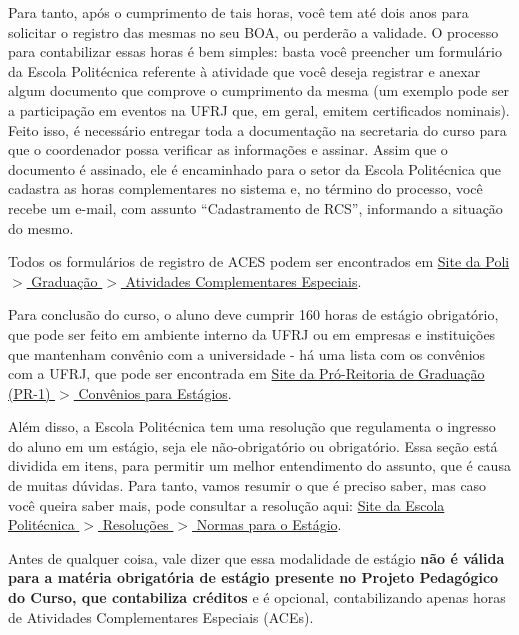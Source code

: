         Para tanto, após o cumprimento de tais horas, você tem até dois anos para solicitar o registro das mesmas no seu BOA, ou perderão a validade. O processo para contabilizar essas horas é bem simples: basta você preencher um formulário da Escola Politécnica referente à atividade que você deseja registrar e anexar algum documento que comprove o cumprimento da mesma (um exemplo pode ser a participação em eventos na UFRJ que, em geral, emitem certificados nominais). Feito isso, é necessário entregar toda a documentação na secretaria do curso para que o coordenador possa verificar as informações e assinar. Assim que o documento é assinado, ele é encaminhado para o setor da Escola Politécnica que cadastra as horas complementares no sistema e, no término do processo, você recebe um e-mail, com assunto ``Cadastramento de RCS'', informando a situação do mesmo.
        
         Todos os formulários de registro de ACES podem ser encontrados em \href{http://www.poli.ufrj.br/graduacao\_aces.php}{Site da Poli $>$ Graduação $>$ Atividades Complementares Especiais}.
    
        Para conclusão do curso, o aluno deve cumprir 160 horas de estágio obrigatório, que pode ser feito em ambiente interno da UFRJ ou em empresas e instituições que mantenham convênio com a universidade - há uma lista com os convênios com a UFRJ, que pode ser encontrada em \href{http://graduacao.ufrj.br/images/stories/_pr1/pdf/estagio/Convenios-para-Estagios.pdf}{Site da Pró-Reitoria de Graduação (PR-1) $>$ Convênios para Estágios}. 
        
        Além disso, a Escola Politécnica tem uma resolução que regulamenta o ingresso do aluno em um estágio, seja ele não-obrigatório ou obrigatório. Essa seção está dividida em itens, para permitir um melhor entendimento do assunto, que é causa de muitas dúvidas. Para tanto, vamos resumir o que é preciso saber, mas caso você queira saber mais, pode consultar a resolução aqui: \href{http://www.poli.ufrj.br/arquivos/resolucoes/n03de290513_Altera_Resolucao02de2009_Normas_para_o_Estagio_de_Estudantes_na_Escola_Politecnica.pdf}{Site da Escola Politécnica $>$ Resoluções $>$ Normas para o Estágio}.
    
            Antes de qualquer coisa, vale dizer que essa modalidade de estágio \textbf{não é válida para a matéria obrigatória de estágio presente no Projeto Pedagógico do Curso, que contabiliza créditos} e é opcional, contabilizando apenas horas de Atividades Complementares Especiais (ACEs). 
        
